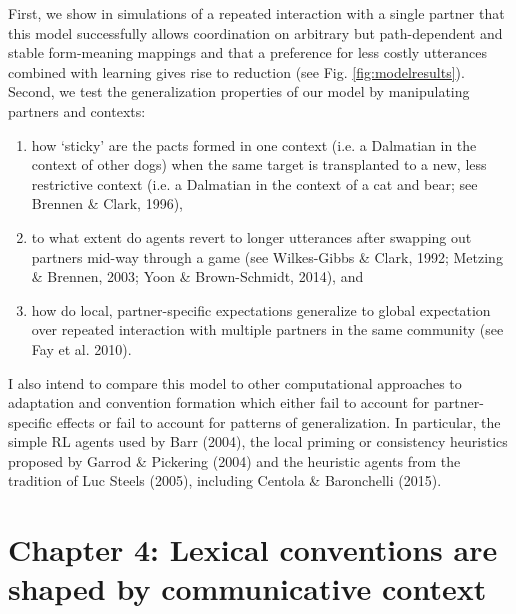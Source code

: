 \documentclass[12pt, donotrepeattitle, man, floatsintext]{apa6}
\begin{document}
First, we show in simulations of a repeated interaction with a single partner that this model successfully allows coordination on arbitrary but path-dependent and stable form-meaning mappings and that a preference for less costly utterances combined with learning gives rise to reduction (see Fig. \ref{fig:modelresults}). Second, we test the generalization properties of our model by manipulating partners and contexts: 
\begin{enumerate}
\item how `sticky' are the pacts formed in one context (i.e. a Dalmatian in the context of other dogs) when the same target is transplanted to a new, less restrictive context (i.e. a Dalmatian in the context of a cat and bear; see Brennen \& Clark, 1996), 
\item to what extent do agents revert to longer utterances after swapping out partners mid-way through a game (see  Wilkes-Gibbs \& Clark, 1992; Metzing \& Brennen, 2003; Yoon \& Brown-Schmidt, 2014), and 
\item how do local, partner-specific expectations generalize to global expectation over repeated interaction with multiple partners in the same community (see Fay et al. 2010).
\end{enumerate}

I also intend to compare this model to other computational approaches to adaptation and convention formation which either fail to account for partner-specific effects or fail to account for patterns of generalization. In particular, the simple RL agents used by Barr (2004), the local priming or consistency heuristics proposed by Garrod \& Pickering (2004) and the heuristic agents from the tradition of Luc Steels (2005), including Centola \& Baronchelli (2015).

\noindent{}
\vspace{1cm}

\section{Chapter 4: Lexical conventions are shaped by communicative context}
\end{document}
